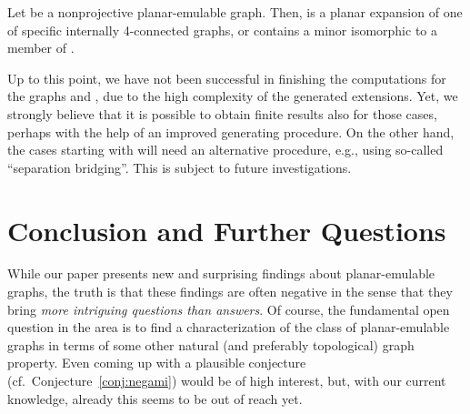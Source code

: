 \documentclass[envcountsect,envcountsame]{llncs}
\begin{document}
\begin{theorem}
\label{thm:our_result}
Let  be a nonprojective planar-emulable graph. 
Then,  is a planar expansion of one of specific  
internally 4-connected graphs, or  contains a minor isomorphic
to a member of .
\end{theorem}

Up to this point, we have not been successful in finishing the computations 
for the graphs  and ,
due to the high complexity of the generated extensions.
Yet, we strongly believe that it is possible to obtain finite results
also for those cases, perhaps with the help of an improved generating procedure.
On the other hand, the cases starting with 
will need an alternative procedure, e.g., using so-called ``separation bridging''.
This is subject to future investigations.










\section{Conclusion and Further Questions}
\label{sec:conclus}

While our paper presents new and surprising findings about
planar-emulable graphs, the truth is that these findings are often negative
in the sense that they bring {\em more intriguing questions than answers}.
Of course, the fundamental open question in the area is to find a
characterization of the class of planar-emulable graphs in terms of some
other natural (and preferably topological) graph property.
Even coming up with a plausible conjecture (cf.~Conjecture~\ref{conj:negami})
would be of high interest, but, with
our current knowledge, already this seems to be out of reach yet.
\end{document}
